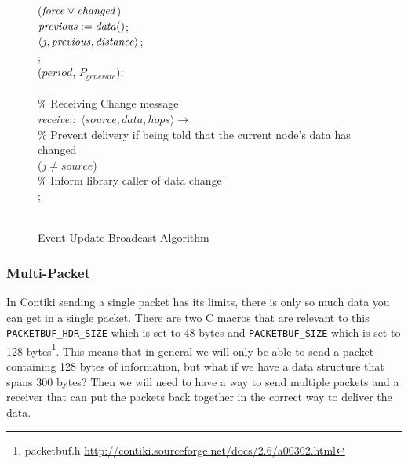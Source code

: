 \begin{figure}[H]
\begin{boxedminipage}{\linewidth}
    \null\qq\qq {} ($\mbox{\emph{force}} \lor \mbox{\emph{changed}}$) \\
    \null\qq\qq\qq $\mbox{\emph{previous}} \mathrel{:=} \mbox{\emph{data}}()$;\\
    \null\qq\qq\qq {}$\langle j, \mbox{\emph{previous}}, \mbox{\emph{distance}}\rangle$;\\
    \null\qq\qq {}; \\
    \null\qq\qq {}($\mathit{period}$, $P_{generate}$); \\~\\
    \null\qq \% Receiving Change message\\
    \null\qq \emph{receive}::~$\langle source, data, hops\rangle \rightarrow$\\
    \null\qq\qq \% Prevent delivery if being told that the current node's data has changed\\
    \null\qq\qq {} ($j \not= source$)  \\
    \null\qq\qq\qq \% Inform library caller of data change\\
    \null\qq\qq {}; \\~\\
  \end{boxedminipage}
  \caption{Event Update Broadcast Algorithm}
\end{figure}


\subsubsection{Multi-Packet}

In Contiki sending a single packet has its limits, there is only so much data you can get in a single packet. There are two C macros that are relevant to this \verb|PACKETBUF_HDR_SIZE| which is set to 48 bytes and \verb|PACKETBUF_SIZE| which is set to 128 bytes\footnote{packetbuf.h \url{http://contiki.sourceforge.net/docs/2.6/a00302.html}}. This means that in general we will only be able to send a packet containing 128 bytes of information, but what if we have a data structure that spans 300 bytes? Then we will need to have a way to send multiple packets and a receiver that can put the packets back together in the correct way to deliver the data.


